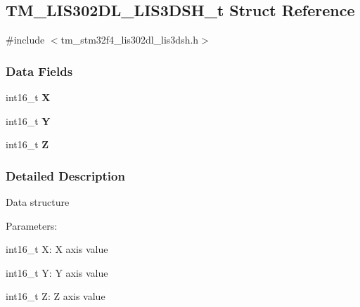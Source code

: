\hypertarget{struct_t_m___l_i_s302_d_l___l_i_s3_d_s_h__t}{}\subsection{T\+M\+\_\+\+L\+I\+S302\+D\+L\+\_\+\+L\+I\+S3\+D\+S\+H\+\_\+t Struct Reference}
\label{struct_t_m___l_i_s302_d_l___l_i_s3_d_s_h__t}


{\ttfamily \#include $<$tm\+\_\+stm32f4\+\_\+lis302dl\+\_\+lis3dsh.\+h$>$}

\subsubsection*{Data Fields}
\begin{DoxyCompactItemize}
\item 
\hypertarget{struct_t_m___l_i_s302_d_l___l_i_s3_d_s_h__t_aa6aba27bc1a89db9e350b50bbf881f57}{}int16\+\_\+t {\bfseries X}\label{struct_t_m___l_i_s302_d_l___l_i_s3_d_s_h__t_aa6aba27bc1a89db9e350b50bbf881f57}

\item 
\hypertarget{struct_t_m___l_i_s302_d_l___l_i_s3_d_s_h__t_abe4637362df8e341470401813999dd17}{}int16\+\_\+t {\bfseries Y}\label{struct_t_m___l_i_s302_d_l___l_i_s3_d_s_h__t_abe4637362df8e341470401813999dd17}

\item 
\hypertarget{struct_t_m___l_i_s302_d_l___l_i_s3_d_s_h__t_a9a9188839f9d62a895b0371d08d0f22b}{}int16\+\_\+t {\bfseries Z}\label{struct_t_m___l_i_s302_d_l___l_i_s3_d_s_h__t_a9a9188839f9d62a895b0371d08d0f22b}

\end{DoxyCompactItemize}


\subsubsection{Detailed Description}
Data structure

Parameters\+:
\begin{DoxyItemize}
\item int16\+\_\+t X\+: X axis value
\item int16\+\_\+t Y\+: Y axis value
\item int16\+\_\+t Z\+: Z axis value 
\end{DoxyItemize}